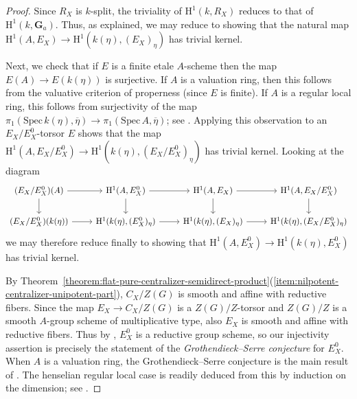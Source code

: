 \documentclass[11pt,reqno]{amsart}
\theoremstyle{definition}
\renewcommand{\rm}{\mathrm}
\newcommand{\Spec}{\mathrm{Spec} \,}
\newcommand{\bG}{{\mathbf G}}
\begin{document}
\begin{proof}
Since $R_X$ is $k$-split, the triviality of $\rm{H}^1(k, R_X)$ reduces to that of $\rm{H}^1(k, \bG_a)$. Thus, as explained, we may reduce to showing that the natural map $\rm{H}^1(A, E_X) \to \rm{H}^1(k(\eta), (E_X)_\eta)$ has trivial kernel. \smallskip

Next, we check that if $E$ is a finite etale $A$-scheme then the map $E(A) \to E(k(\eta))$ is surjective. If $A$ is a valuation ring, then this follows from the valuative criterion of properness (since $E$ is finite). If $A$ is a regular local ring, this follows from surjectivity of the map $\pi_1(\Spec k(\eta), \overline{\eta}) \to \pi_1(\Spec A, \overline{\eta})$; see \cite[Exp.\ V, Prop.\ 8.2]{SGA1}. Applying this observation to an $E_X/E_X^0$-torsor $E$ shows that the map $\rm{H}^1(A, E_X/E_X^0) \to \rm{H}^1(k(\eta), (E_X/E_X^0)_\eta)$ has trivial kernel. Looking at the diagram
\[
\begin{tikzcd}
(E_X/E_X^0)(A) \arrow[r] \arrow[d]
    &\rm{H}^1(A, E_X^0) \arrow[r] \arrow[d]
    &\rm{H}^1(A, E_X) \arrow[r] \arrow[d]
    &\rm{H}^1(A, E_X/E_X^0) \arrow[d] \\
(E_X/E_X^0)(k(\eta)) \arrow[r]
    &\rm{H}^1(k(\eta), (E_X^0)_\eta) \arrow[r]
    &\rm{H}^1(k(\eta), (E_X)_\eta) \arrow[r]
    &\rm{H}^1(k(\eta), (E_X/E_X^0)_\eta)
\end{tikzcd}
\]
we may therefore reduce finally to showing that $\rm{H}^1(A, E_X^0) \to \rm{H}^1(k(\eta), E_X^0)$ has trivial kernel. \smallskip

By Theorem~\ref{theorem:flat-pure-centralizer-semidirect-product}(\ref{item:nilpotent-centralizer-unipotent-part}), $C_X/Z(G)$ is smooth and affine with reductive fibers. Since the map $E_X \to C_X/Z(G)$ is a $Z(G)/Z$-torsor and $Z(G)/Z$ is a smooth $A$-group scheme of multiplicative type, also $E_X$ is smooth and affine with reductive fibers. Thus by \cite[Prop.\ 3.1.3]{Conrad}, $E_X^0$ is a reductive group scheme, so our injectivity assertion is precisely the statement of the \textit{Grothendieck--Serre conjecture} for $E_X^0$. When $A$ is a valuation ring, the Grothendieck--Serre conjecture is the main result of \cite{Guo-valuation}. The henselian regular local case is readily deduced from this by induction on the dimension; see \cite[6.6.1]{CTS}.
\end{proof}
\end{document}
